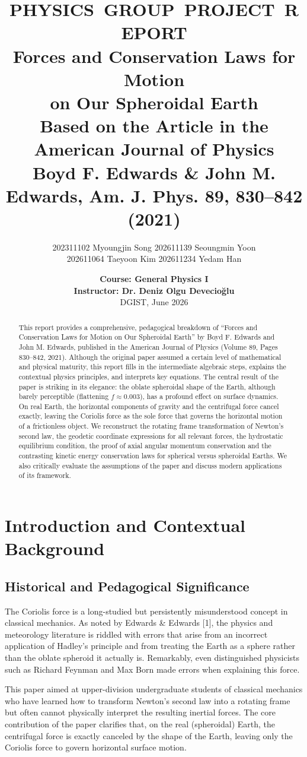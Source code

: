 \documentclass[10pt, a4paper]{article}
\title{
\mbox{\textbf{PHYSICS GROUP PROJECT REPORT}}\\
\vspace{0.5cm}
\Large{Forces and Conservation Laws for Motion\\ on Our Spheroidal Earth}\\
\vspace{2cm}
\normalsize Based on the Article in the American Journal of Physics\\ 
Boyd F. Edwards \& John M. Edwards, Am. J. Phys. 89, 830–842 (2021)}
\author{202311102 Myoungjin Song 202611139 Seoungmin Yoon \\ {202611064 Taeyoon Kim 202611234 Yedam Han} }
\date{\textbf{Course: General Physics I} \\ 
\textbf{Instructor: Dr. Deniz Olgu Devecioğlu} \\
\vspace{0.5cm} DGIST, June 2026}
\begin{document}
\maketitle

\begin{abstract}
This report provides a comprehensive, pedagogical breakdown of “Forces and Conservation Laws for Motion on Our Spheroidal Earth” by Boyd F. Edwards and John M. Edwards, published in the American Journal of Physics (Volume 89, Pages 830–842, 2021). Although the original paper assumed a certain level of mathematical and physical maturity, this report fills in the intermediate algebraic steps, explains the contextual physics principles, and interprets key equations. The central result of the paper is striking in its elegance: the oblate spheroidal shape of the Earth, although barely perceptible (flattening $f \approx 0.003$), has a profound effect on surface dynamics. On real Earth, the horizontal components of gravity and the centrifugal force cancel exactly, leaving the Coriolis force as the sole force that governs the horizontal motion of a frictionless object. We reconstruct the rotating frame transformation of Newton’s second law, the geodetic coordinate expressions for all relevant forces, the hydrostatic equilibrium condition, the proof of axial angular momentum conservation and the contrasting kinetic energy conservation laws for spherical versus spheroidal Earths. We also critically evaluate the assumptions of the paper and discuss modern applications of its framework. 
\end{abstract}

\section{Introduction and Contextual Background}
\subsection{Historical and Pedagogical Significance}
The Coriolis force is a long-studied but persistently misunderstood concept in classical mechanics. As noted by Edwards \& Edwards [1], the physics and meteorology literature is riddled with errors that arise from an incorrect application of Hadley’s principle and from treating the Earth as a sphere rather than the oblate spheroid it actually is. Remarkably, even distinguished physicists such as Richard Feynman and Max Born made errors when explaining this force. 

This paper aimed at upper-division undergraduate students of classical mechanics who have learned how to transform Newton’s second law into a rotating frame but often cannot physically interpret the resulting inertial forces. The core contribution of the paper clarifies that, on the real (spheroidal) Earth, the centrifugal force is exactly canceled by the shape of the Earth, leaving only the Coriolis force to govern horizontal surface motion. 
\end{document}
